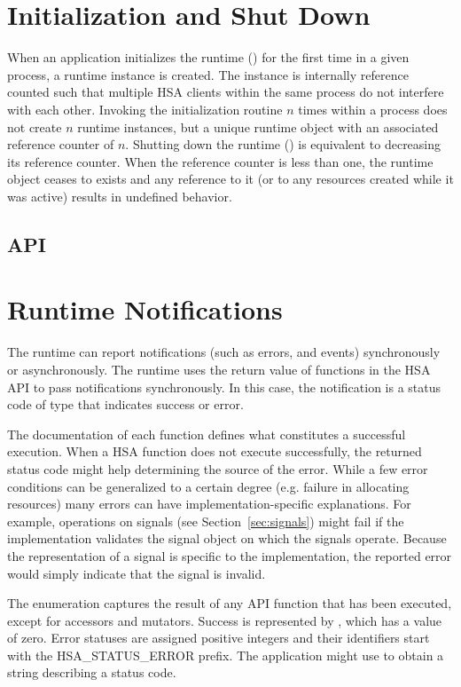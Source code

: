 \documentclass[final]{book}
\newcommand{\reftyp}[1]{#1}
\newcommand{\refenu}[1]{\reftyp{#1}}
\begin{document}
\section{Initialization and Shut Down}\label{sec:init}
When an application initializes the runtime () for the first time
in a given process, a runtime instance is created. The instance is internally
reference counted such that multiple HSA clients within the same process do not
interfere with each other. Invoking the initialization routine $n$ times within
a process does not create $n$ runtime instances, but a unique runtime object
with an associated reference counter of $n$. Shutting down the runtime
() is equivalent to decreasing its reference counter. When
the reference counter is less than one, the runtime object ceases to exists and
any reference to it (or to any resources created while it was active) results in
undefined behavior.

\subsection{API}


\section{Runtime Notifications}
\label{sec:error}

The runtime can report notifications (such as errors, and events) synchronously
or asynchronously. The runtime uses the return value of functions in the HSA API
to pass notifications synchronously. In this case, the notification is a status
code of type  that indicates success or error.

The documentation of each function defines what constitutes a successful
execution. When a HSA function does not execute successfully, the returned
status code might help determining the source of the error. While a few error
conditions can be generalized to a certain degree (e.g. failure in allocating
resources) many errors can have implementation-specific explanations. For
example, operations on signals (see Section~\ref{sec:signals}) might
fail if the implementation validates the signal object on which the signals
operate. Because the representation of a signal is specific to the
implementation, the reported error would simply indicate that the signal is
invalid.

The  enumeration captures the result of any API function
that has been executed, except for accessors and mutators. Success is
represented by , which has a value of zero. Error
statuses are assigned positive integers and their identifiers start with the
\refenu{HSA_STATUS_ERROR} prefix. The application might use
 to obtain a string describing a status code.
\end{document}
